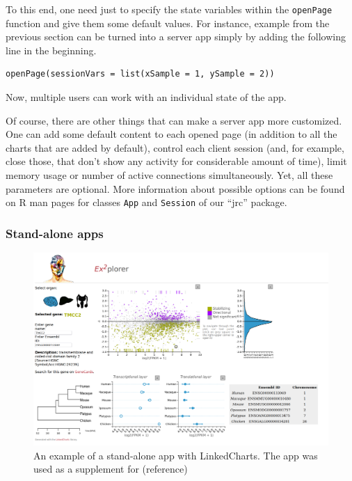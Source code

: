 \documentclass[twocolumn,10pt]{article}
\begin{document}
To this end, one need just to specify the state variables within the \texttt{openPage} function and give them some default values. For instance, example from the previous section can be turned into a server app simply by adding the following line in the beginning.

\begin{verbatim}
openPage(sessionVars = list(xSample = 1, ySample = 2))
\end{verbatim}

Now, multiple users can work with an individual state of the app.

Of course, there are other things that can make a server app more customized. One can add some default content to each opened page (in addition to all the charts that are added by default), control each client session (and, for example, close those, that don't show any activity for considerable amount of time), limit memory usage or number of active connections simultaneously. Yet, all these parameters are optional. More information about possible options can be found on R man pages for classes \texttt{App} and \texttt{Session} of our ``jrc'' package.

\subsubsection{Stand-alone apps}

\begin{figure}
  \includegraphics[width=\textwidth]{FigF/figF.png}
  \caption{An example of a stand-alone app with LinkedCharts. The app was used as a supplement for (reference)}
  \label{FigF}
\end{figure}
\end{document}
